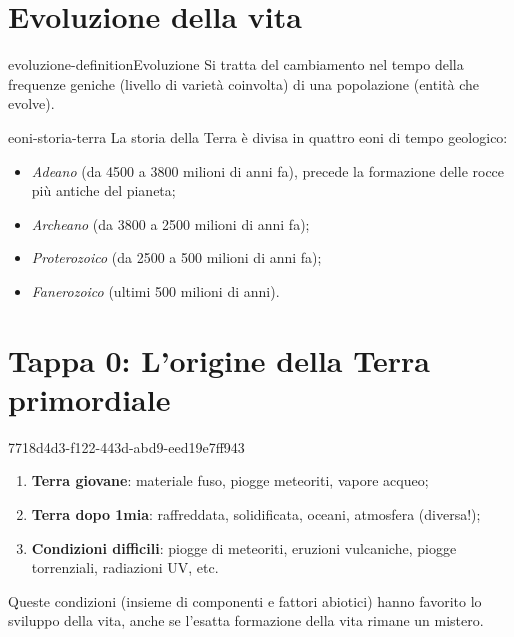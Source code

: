 \documentclass[preview]{standalone}
\begin{document}
\genpage

\section{Evoluzione della vita}

\begin{snippetdefinition}{evoluzione-definition}{Evoluzione}
    Si tratta del cambiamento nel tempo della frequenze geniche (livello di varietà coinvolta)
    di una popolazione (entità che evolve).
\end{snippetdefinition}

\begin{snippet}{eoni-storia-terra}
    La storia della Terra è divisa in quattro eoni di tempo geologico:
    \begin{itemize}
        \item \textit{Adeano} (da 4500 a 3800 milioni di anni fa), precede
        la formazione delle rocce più antiche del pianeta;
        \item \textit{Archeano} (da 3800 a 2500 milioni di anni fa);
        \item \textit{Proterozoico} (da 2500 a 500 milioni di anni fa);
        \item \textit{Fanerozoico} (ultimi 500 milioni di anni).
    \end{itemize}
\end{snippet}


\section{Tappa 0: L'origine della Terra primordiale}

\begin{snippet}{7718d4d3-f122-443d-abd9-eed19e7ff943}
    \begin{enumerate}
        \item \textbf{Terra giovane}: materiale fuso, piogge meteoriti, vapore acqueo;
        \item \textbf{Terra dopo 1mia}: raffreddata, solidificata, oceani, atmosfera (diversa!);
        \item \textbf{Condizioni difficili}: piogge di meteoriti, eruzioni vulcaniche, piogge torrenziali, radiazioni UV, etc.
    \end{enumerate}

    Queste condizioni (insieme di componenti e fattori abiotici) hanno
    favorito lo sviluppo della vita, anche se l'esatta formazione della vita rimane un mistero.
\end{snippet}
\end{document}
